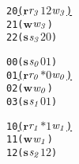 \newsavebox{\boxthree}
\begin{lrbox}{\boxthree}
\begin{minipage}[t]{0.65\linewidth}
\large
\begin{alltt}
20 \underline{(\(\mathbf{r}\) \(\mathit{r\sb{3}}\) \(\mathit{1 2}\) \(\mathit{w\sb{3}}\))}
21 (\(\mathbf{w}\) \(\mathit{w\sb{3}}\))
22 (\(\mathbf{s}\) \(\mathit{s\sb{3}}\) \(\mathit{2 0}\))
\end{alltt}
\end{minipage}
\end{lrbox}


\newcommand\examplefigthree{
\begin{figure*}[tb]
\begin{center}
\setlength{\tabcolsep}{2pt}
\begin{tabular}[t]{c|c|c}
$p_0$ & $p_1$ & $p_2$ \\
\hline
\scalebox{0.8}{\usebox{\boxone}}&
\scalebox{0.8}{\usebox{\boxtwo}} &
\scalebox{0.8}{\usebox{\boxthree}}\\
\end{tabular}
\end{center}
\caption{A Deadlock Caused by Circular Dependency in Messages}
\label{fig:deadlock2}
\end{figure*}
}


\newsavebox{\boxoneno}
\begin{lrbox}{\boxoneno}
\begin{minipage}[t]{0.65\linewidth}
\large
\begin{alltt}
00 (\(\mathbf{s}\) \(\mathit{s\sb{0}}\) \(\mathit{0 1}\))
01 \underline{(\(\mathbf{r}\) \(\mathit{r\sb{0}}\) \(\mathit{\ast 0}\) \(\mathit{w\sb{0}}\))}
02 (\(\mathbf{w}\) \(\mathit{w\sb{0}}\))
03 (\(\mathbf{s}\) \(\mathit{s\sb{1}}\) \(\mathit{0 1}\))
\end{alltt}
\end{minipage}
\end{lrbox}

\newsavebox{\boxtwono}
\begin{lrbox}{\boxtwono}
\begin{minipage}[t]{0.65\linewidth}
\large
\begin{alltt}
10 \underline{(\(\mathbf{r}\) \(\mathit{r\sb{1}}\) \(\mathit{\ast 1}\) \(\mathit{w\sb{1}}\))}
11 (\(\mathbf{w}\) \(\mathit{w\sb{1}}\))
12 (\(\mathbf{s}\) \(\mathit{s\sb{2}}\) \(\mathit{1 2}\))
\end{alltt}
\end{minipage}
\end{lrbox}

